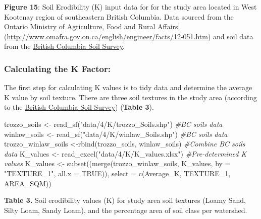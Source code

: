 \documentclass[
]{article}
\newenvironment{Shaded}{\begin{snugshade}}{\end{snugshade}}
\newcommand{\AttributeTok}[1]{\textcolor[rgb]{0.77,0.63,0.00}{#1}}
\newcommand{\CommentTok}[1]{\textcolor[rgb]{0.56,0.35,0.01}{\textit{#1}}}
\newcommand{\ConstantTok}[1]{\textcolor[rgb]{0.00,0.00,0.00}{#1}}
\newcommand{\FunctionTok}[1]{\textcolor[rgb]{0.00,0.00,0.00}{#1}}
\newcommand{\NormalTok}[1]{#1}
\newcommand{\OtherTok}[1]{\textcolor[rgb]{0.56,0.35,0.01}{#1}}
\newcommand{\StringTok}[1]{\textcolor[rgb]{0.31,0.60,0.02}{#1}}
\begin{document}
\textbf{Figure 15}: Soil Erodibility (K) input data for for the study area located in West Kootenay region of southeastern British Columbia. Data sourced from the Ontario Ministry of Agriculture, Food and Rural Affairs{]}(\url{http://www.omafra.gov.on.ca/english/engineer/facts/12-051.htm}) and soil data from the \href{https://catalogue.data.gov.bc.ca/dataset/20150a67-5a2d-425f-8216-ff0f97f68df9}{British Columbia Soil Survey}.

\hypertarget{sec-calculating-the-k-factor}{%
\subsubsection*{Calculating the K Factor:}\label{sec-calculating-the-k-factor}}

The first step for calculating K values is to tidy data and determine the average K value by soil texture. There are three soil textures in the study area (according to the \href{https://catalogue.data.gov.bc.ca/dataset/20150a67-5a2d-425f-8216-ff0f97f68df9}{British Columbia Soil Survey}) (\textbf{Table 3}).

\begin{Shaded}
\begin{Highlighting}[]
\NormalTok{trozzo\_soils }\OtherTok{\textless{}{-}} \FunctionTok{read\_sf}\NormalTok{(}\StringTok{"data/4/K/trozzo\_Soils.shp"}\NormalTok{) }\CommentTok{\#BC soils data}
\NormalTok{winlaw\_soils }\OtherTok{\textless{}{-}} \FunctionTok{read\_sf}\NormalTok{(}\StringTok{"data/4/K/winlaw\_Soils.shp"}\NormalTok{) }\CommentTok{\#BC soils data}
\NormalTok{trozzo\_winlaw\_soils }\OtherTok{\textless{}{-}}\FunctionTok{rbind}\NormalTok{(trozzo\_soils, winlaw\_soils) }\CommentTok{\#Combine BC soils data}
\NormalTok{K\_values }\OtherTok{\textless{}{-}} \FunctionTok{read\_excel}\NormalTok{(}\StringTok{"data/4/K/K\_values.xlsx"}\NormalTok{) }\CommentTok{\#Pre{-}determined K values}
\NormalTok{K\_values }\OtherTok{\textless{}{-}} \FunctionTok{subset}\NormalTok{((}\FunctionTok{merge}\NormalTok{(trozzo\_winlaw\_soils, K\_values, }\AttributeTok{by =} \StringTok{"TEXTURE\_1"}\NormalTok{, }\AttributeTok{all.x =} \ConstantTok{TRUE}\NormalTok{)), }\AttributeTok{select =} \FunctionTok{c}\NormalTok{(Average\_K, TEXTURE\_1, AREA\_SQM))}
\end{Highlighting}
\end{Shaded}

\textbf{Table 3.} Soil erodibility values (K) for study area soil textures (Loamy Sand, Silty Loam, Sandy Loam), and the percentage area of soil class per watershed.
\end{document}

